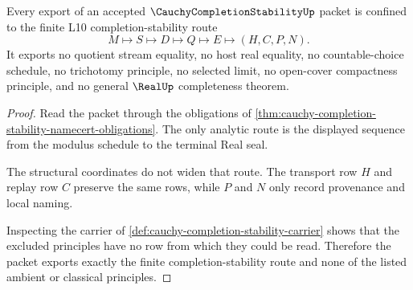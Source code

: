 \begin{theorem}
\label{thm:cauchy-completion-stability-cross-chapter-scope}
Every export of an accepted $\CauchyCompletionStabilityUp$ packet is confined to the finite L10 completion-stability route
$$
M\longmapsto S\longmapsto D\longmapsto Q\longmapsto E\longmapsto(H,C,P,N).
$$
It exports no quotient stream equality, no host real equality, no countable-choice schedule, no trichotomy principle, no selected limit, no open-cover compactness principle, and no general $\RealUp$ completeness theorem.
\end{theorem}
\begin{proof}
Read the packet through the obligations of \autoref{thm:cauchy-completion-stability-namecert-obligations}. The only analytic route is the displayed sequence from the modulus schedule to the terminal Real seal.

The structural coordinates do not widen that route. The transport row $H$ and replay row $C$ preserve the same rows, while $P$ and $N$ only record provenance and local naming.

Inspecting the carrier of \autoref{def:cauchy-completion-stability-carrier} shows that the excluded principles have no row from which they could be read. Therefore the packet exports exactly the finite completion-stability route and none of the listed ambient or classical principles.
\end{proof}

\begin{closurestatus}{\CauchyCompletionStabilityUp}
  \theoryclosure{\seedClosure}
  \formalstatus{\unformalizedV}
\end{closurestatus}
